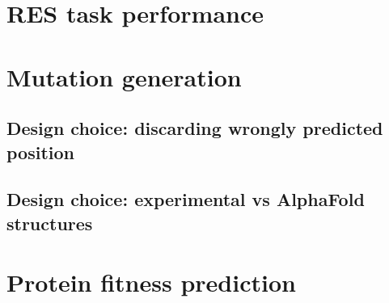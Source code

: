\section{RES task performance}

\section{Mutation generation}

\subsection{Design choice: discarding wrongly predicted position}

\subsection{Design choice: experimental vs AlphaFold structures}

\section{Protein fitness prediction}


